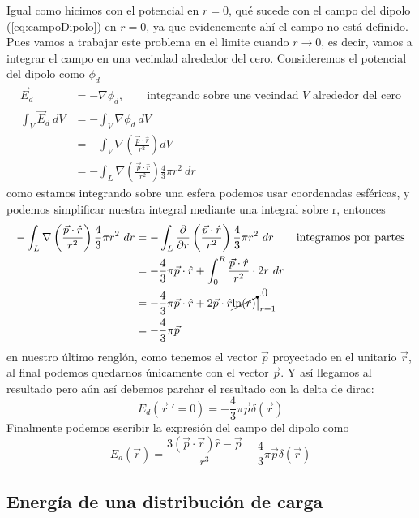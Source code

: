 \documentclass[11pt,a4paper]{article}
\begin{document}
Igual como hicimos con el potencial en $r=0$, qué sucede con el campo del dipolo (\ref{eq:campoDipolo}) en $r=0$, ya que evidenemente ahí el campo no está definido. Pues vamos a trabajar este problema en el limite cuando $r\to0$, es decir, vamos a integrar el campo en una vecindad alrededor del cero. Consideremos el potencial del dipolo como $\phi_d$
\begin{align*}
\vec{E}_d&=-\nabla\phi_d,\qquad\text{integrando sobre une vecindad $V$ alrededor del cero}\\
\int_V\vec{E}_d\ dV&=-\int_V \nabla\phi_d\ dV\\
&=-\int_V \nabla\left(\frac{\vec{p}\cdot\hat{r}}{r^2}\right) dV\\
&=-\int_L\nabla\left(\frac{\vec{p}\cdot\hat{r}}{r^2}\right)\frac{4}{3}\pi r^2\ dr
\end{align*}
como estamos integrando sobre una esfera podemos usar coordenadas esféricas, y podemos simplificar nuestra integral mediante una integral sobre r, entonces
\begin{align*}
-\int_L\nabla\left(\frac{\vec{p}\cdot\hat{r}}{r^2}\right)\frac{4}{3}\pi r^2\ dr&=-\int_L\frac{\partial}{\partial r}\left(\frac{\vec{p}\cdot\hat{r}}{r^2}\right)\frac{4}{3}\pi r^2\ dr\qquad\text{integramos por partes}	\\
&=-\frac{4}{3}\pi\vec{p}\cdot\hat{r}+\int_0^R\frac{\vec{p}\cdot\hat{r}}{r^2}\cdot 2r\ dr\\
&=-\frac{4}{3}\pi\vec{p}\cdot\hat{r}+2\vec{p}\cdot\hat{r}\cancelto{0}{\ln(r)}\big |_{r=1}\\
&=-\frac{4}{3}\pi\vec{p} 
\end{align*}
en nuestro último renglón, como tenemos el vector $\vec{p}$ proyectado en el unitario $\vec{r}$, al final podemos quedarnos únicamente con el vector $\vec{p}$. Y así llegamos al resultado pero aún así debemos parchar el resultado con la delta de dirac:
$$E_d(\vec{r}\ '=0)=-\frac{4}{3}\pi\vec{p}\delta(\vec{r})$$
Finalmente podemos escribir la expresión del campo del dipolo como
\begin{equation}\label{eq:E_dipoloChida}
E_d(\vec{r})=\frac{3(\vec{p}\cdot\vec{r})\hat{r}-\vec{p}}{r^3}-\frac{4}{3}\pi\vec{p}\delta(\vec{r})
\end{equation}

\newpage
\subsection{Energía de una distribución de carga}
\end{document}

